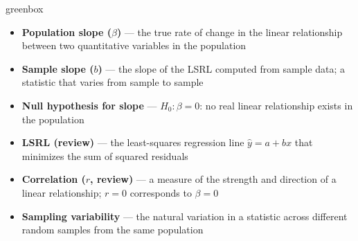 \documentclass[10pt]{article}
\begin{document}
\begin{skillbox}{greenbox}
\begin{minipage}[t]{0.48\linewidth}
    \begin{itemize}
        \item \textbf{Population slope ($\beta$)} --- the true rate of change in the
              linear relationship between two quantitative variables in the population
        \item \textbf{Sample slope ($b$)} --- the slope of the LSRL computed from
              sample data; a statistic that varies from sample to sample
        \item \textbf{Null hypothesis for slope} --- $H_0\colon \beta = 0$: no real
              linear relationship exists in the population
    \end{itemize}
\end{minipage}
\hfill
\begin{minipage}[t]{0.48\linewidth}
    \begin{itemize}
        \item \textbf{LSRL (review)} --- the least-squares regression line
              $\hat{y} = a + bx$ that minimizes the sum of squared residuals
        \item \textbf{Correlation ($r$, review)} --- a measure of the strength and
              direction of a linear relationship; $r = 0$ corresponds to $\beta = 0$
        \item \textbf{Sampling variability} --- the natural variation in a statistic
              across different random samples from the same population
    \end{itemize}
\end{minipage}
\end{skillbox}
\end{document}
